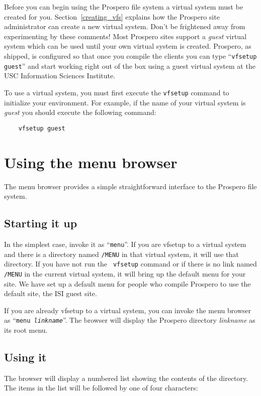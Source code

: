 Before you can begin using the Prospero file system a virtual system
must be created for you.  Section~\ref{creating_vfs} explains how the Prospero
site administrator can create a new virtual system.   Don't be frightened away from
experimenting by these comments!    Most Prospero
sites support a {\it guest} virtual system which can be used until your
own virtual system is created.   Prospero, as shipped, is configured
so that once you compile the clients you can type ``{\tt vfsetup
guest}'' and start working right out of the box using a guest virtual
system at the USC Information Sciences Institute.

To use a virtual system, you must first execute the {\tt vfsetup}
command to initialize your environment.  For example, if the name of
your virtual system is {\it guest} you should execute the following
command:

\begin{verbatim}
    vfsetup guest
\end{verbatim}

\section{Using the menu browser}

The menu browser provides a simple straightforward interface to the
Prospero file system.   

\subsection{Starting it up}
In the simplest case, invoke it as ``{\tt menu}''.  If you are vfsetup to a
virtual system and there is a directory named {\tt /MENU} in that virtual
system, it will use that directory.  If you have not run the  {\tt
vfsetup} command or if there is no link named {\tt /MENU} in the
current virtual system, it will bring up the default menu for your
site.  We have set up a default menu for people who compile Prospero
to use the default site, the ISI guest site.

If you are already vfsetup to a virtual system, you can invoke the
menu browser as ``{\tt menu {\it linkname}}''.  The browser will
display the Prospero directory {\it linkname} as its root menu.

\subsection{Using it}

The browser will display a numbered list showing the contents of the
directory.  The items in the list will be followed by one of four
characters:

